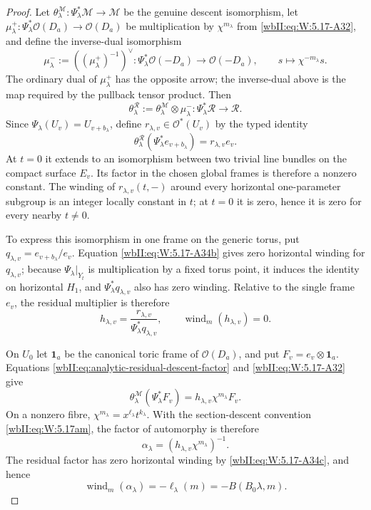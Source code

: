 \begin{proof}
Let
\(\theta^{\mathcal M}_\lambda:\Psi_\lambda^*\mathcal M\to\mathcal M\)
be the genuine descent isomorphism, let
\(\mu^+_\lambda:\Psi_\lambda^*\mathcal O(D_a)\to\mathcal O(D_a)\)
be multiplication by \(\chi^{m_\lambda}\) from \eqref{wbII:eq:W:5.17-A32}, and define the
inverse-dual isomorphism
\[
 \mu^-_\lambda:=((\mu^+_\lambda)^{-1})^\vee:
 \Psi_\lambda^*\mathcal O(-D_a)\longrightarrow\mathcal O(-D_a),
 \qquad s\longmapsto\chi^{-m_\lambda}s.
\]
The ordinary dual of \(\mu^+_\lambda\) has the opposite arrow; the
inverse-dual above is the map required by the pullback tensor product.  Then
\[
 \theta^{\mathcal R}_\lambda
 :=\theta^{\mathcal M}_\lambda\otimes\mu^-_\lambda:
 \Psi_\lambda^*\mathcal R\longrightarrow\mathcal R.
\]
Since \(\Psi_\lambda(U_v)=U_{v+b_\lambda}\), define
\(r_{\lambda,v}\in\mathcal O^*(U_v)\) by the typed identity
\begin{equation}
 \theta^{\mathcal R}_\lambda
   (\Psi_\lambda^*e_{v+b_\lambda})
 =r_{\lambda,v}e_v.
\label{wbII:eq:analytic-residual-descent-factor}
\end{equation}
At \(t=0\) it extends to an isomorphism between two trivial line bundles
on the compact surface \(E_v\).  Its factor in the chosen global frames is
therefore a nonzero constant.  The winding of
\(r_{\lambda,v}(t,-)\) around every horizontal one-parameter subgroup is
an integer locally constant in \(t\); at \(t=0\) it is zero, hence it is
zero for every nearby \(t\ne0\).

To express this isomorphism in one frame on the generic torus, put
\(q_{\lambda,v}=e_{v+b_\lambda}/e_v\).  Equation \eqref{wbII:eq:W:5.17-A34b} gives zero
horizontal winding for \(q_{\lambda,v}\); because
\(\Psi_\lambda|_{Y_t}\) is multiplication by a fixed torus point, it
induces the identity on horizontal \(H_1\), and
\(\Psi_\lambda^*q_{\lambda,v}\) also has zero winding.  Relative to the
single frame \(e_v\), the residual multiplier is therefore
\[
 h_{\lambda,v}
 =\frac{r_{\lambda,v}}{\Psi_\lambda^*q_{\lambda,v}},
 \qquad
 \operatorname{wind}_m(h_{\lambda,v})=0.
\tag{W.137}\label{wbII:eq:W:5.17-A34c}
\]

On \(U_0\) let \(\mathbf1_a\) be the canonical toric frame of
\(\mathcal O(D_a)\), and put \(F_v=e_v\otimes\mathbf1_a\).  Equations
\cref{wbII:eq:analytic-residual-descent-factor} and \eqref{wbII:eq:W:5.17-A32} give
\[
 \theta^{\mathcal M}_\lambda(\Psi_\lambda^*F_v)
 =h_{\lambda,v}\chi^{m_\lambda}F_v.
\]
On a nonzero fibre, \(\chi^{m_\lambda}=x^{\ell_\lambda}t^{k_\lambda}\).
With the section-descent convention \eqref{wbII:eq:W:5.17am}, the factor of automorphy is
therefore
\[
 \alpha_\lambda=(h_{\lambda,v}\chi^{m_\lambda})^{-1}.
\]
The residual factor has zero horizontal winding by \eqref{wbII:eq:W:5.17-A34c}, and hence
\begin{equation}
 \operatorname{wind}_m(\alpha_\lambda)
 =-\ell_\lambda(m)=-B(B_0\lambda,m).
\label{wbII:eq:analytic-factor-horizontal-winding}
\end{equation}


\end{proof}
